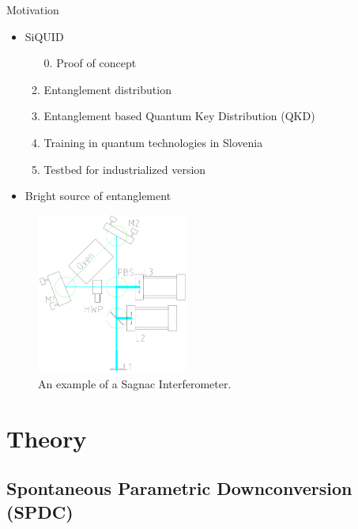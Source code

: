 \documentclass[serif,8pt]{beamer}
\begin{document}
\addtocounter{framenumber}{-1}
\begin{frame}{Motivation}
	\begin{minipage}[l]{0.48\textwidth}
		\begin{itemize}
			\item SiQUID 
				\begin{enumerate}
					\item[0.] Proof of concept
					\item Entanglement distribution
					\item Entanglement based Quantum Key Distribution (QKD)
					\item Training in quantum technologies in Slovenia
					\item Testbed for industrialized version
				\end{enumerate}
			\item Bright source of entanglement
		\end{itemize}
	\end{minipage}
	\begin{minipage}[r]{0.48\textwidth}
		\begin{figure}
			\begin{center}
				\includegraphics[width=5cm]{SagnacCAD.png}
			\end{center}
			\caption{An example of a Sagnac Interferometer.}
		\end{figure}
	\end{minipage}
\end{frame}

\section{Theory}
\subsection{Spontaneous Parametric Downconversion (SPDC)}
\end{document}
